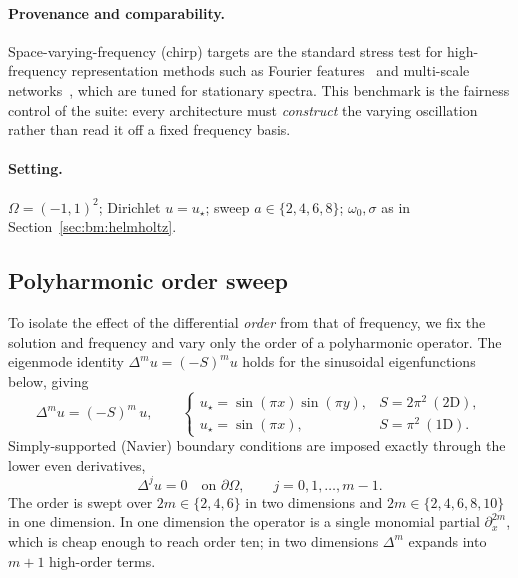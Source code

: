 \paragraph{Provenance and comparability.}
Space-varying-frequency (chirp) targets are the standard stress test for
high-frequency representation methods such as Fourier
features~\cite{Tancik2020Fourier} and multi-scale
networks~\cite{Liu2020MscaleDNN}, which are tuned for stationary spectra. This
benchmark is the fairness control of the suite: every architecture must
\emph{construct} the varying oscillation rather than read it off a fixed
frequency basis.

\paragraph{Setting.}
\(\Omega=(-1,1)^2\); Dirichlet \(u=u_\star\); sweep \(a\in\{2,4,6,8\}\);
\(\omega_0,\sigma\) as in Section~\ref{sec:bm:helmholtz}.

\subsection{Polyharmonic order sweep}\label{sec:bm:poly}

To isolate the effect of the differential \emph{order} from that of frequency,
we fix the solution and frequency and vary only the order of a polyharmonic
operator. The eigenmode identity \(\Delta^m u = (-S)^m u\) holds for the
sinusoidal eigenfunctions below, giving
\begin{equation}\label{eq:poly_pde}
  \Delta^m u = (-S)^m\,u,
  \qquad
  \begin{cases}
    u_\star = \sin(\pi x)\sin(\pi y), & S = 2\pi^2 \ (\text{2D}),\\[2pt]
    u_\star = \sin(\pi x),            & S = \pi^2 \ (\text{1D}).
  \end{cases}
\end{equation}
Simply-supported (Navier) boundary conditions are imposed exactly through the
lower even derivatives,
\begin{equation}\label{eq:poly_bc}
  \Delta^j u = 0 \quad \text{on } \partial\Omega,
  \qquad j = 0,1,\dots,m-1 .
\end{equation}
The order is swept over \(2m \in \{2,4,6\}\) in two dimensions and
\(2m \in \{2,4,6,8,10\}\) in one dimension. In one dimension the operator is a
single monomial partial \(\partial_x^{2m}\), which is cheap enough to reach order
ten; in two dimensions \(\Delta^m\) expands into \(m+1\) high-order terms.

